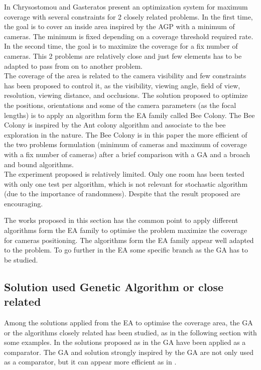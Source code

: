  In Chrysostomou and Gasteratos \cite{82*chrysostomou2012} present an optimization system for maximum coverage with several constraints for 2 closely related problems. In the first time, the goal is to cover an inside area inspired by the AGP with a minimum of cameras.  The minimum is fixed depending  on a coverage threshold required rate. In the second time, the goal is to maximize the coverage for a fix number of cameras. This 2 problems are relatively close and just few elements has to be adapted to pass from on to another problem.\\
The coverage of the area is related to the camera visibility and few constraints has been proposed to control it, as the visibility, viewing angle, field of view, resolution, viewing distance, and occlusions. The solution proposed to optimize the positions, orientations and some of the camera parameters (as the focal lengths) is to apply an algorithm form the EA family called Bee Colony. The Bee Colony is inspired by the Ant colony algorithm and associate to the bee exploration in the nature. The Bee Colony is in this  paper \cite{82*chrysostomou2012} the more efficient of the two problems formulation (minimum of cameras and maximum of coverage with a fix number of cameras) after a brief comparison with a GA and a broach and bound algorithms. \\
The experiment proposed is relatively limited. Only one room has been tested with only one test per algorithm, which is not relevant for stochastic algorithm (due to the importance of randomness). Despite that the result proposed are encouraging. 

The works proposed in this section has the common point to apply different algorithms form the EA family to optimise the problem maximize the coverage for cameras positioning. The algorithms form the EA family appear well adapted to the problem. To go further in the EA some specific branch as the GA has to be studied.

\subsection{Solution used Genetic Algorithm or close related}

 Among the solutions applied from the EA to optimise the coverage area, the GA or the algorithms closely related has been studied, as in the following section with some examples.
 In the solutions proposed as in \cite{82*chrysostomou2012,33*reddy2012,141*akbarzadeh2013} the GA have been applied as a comparator. The GA and solution strongly inspired by the GA  are not only used as a comparator, but it can appear more efficient as in \cite{83*van2009,101*topcuoglu2009,165*jiang2010,152*wang2009}.


